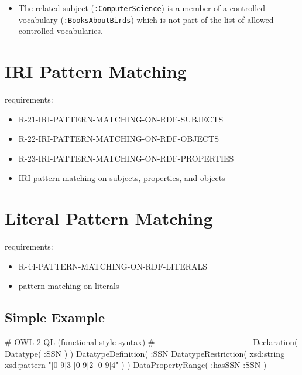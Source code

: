 \documentclass{llncs}
\newcommand{\ms}[1]{\texttt{#1}}
\begin{document}
\begin{itemize}
	\item The related subject (\ms{:ComputerScience}) is a member of a controlled vocabulary (\ms{:BooksAboutBirds}) 
which is not part of the list of allowed controlled vocabularies.
\end{itemize}

\section{IRI Pattern Matching}

requirements:

\begin{itemize}
	\item R-21-IRI-PATTERN-MATCHING-ON-RDF-SUBJECTS
  \item R-22-IRI-PATTERN-MATCHING-ON-RDF-OBJECTS
  \item R-23-IRI-PATTERN-MATCHING-ON-RDF-PROPERTIES
\end{itemize}



\begin{itemize}
	\item IRI pattern matching on subjects, properties, and objects
\end{itemize}

\section{Literal Pattern Matching}

requirements:

\begin{itemize}
  \item R-44-PATTERN-MATCHING-ON-RDF-LITERALS
\end{itemize}



\begin{itemize}
	\item pattern matching on literals
\end{itemize}

\subsection{Simple Example}

\begin{ex}
# OWL 2 QL (functional-style syntax)
# ----------------------------------
Declaration( Datatype( :SSN ) ) 
DatatypeDefinition( 
    :SSN
    DatatypeRestriction( xsd:string xsd:pattern "[0-9]{3}-[0-9]{2}-[0-9]{4}" ) )     
DataPropertyRange( :hasSSN :SSN ) 
\end{ex}
\end{document}
